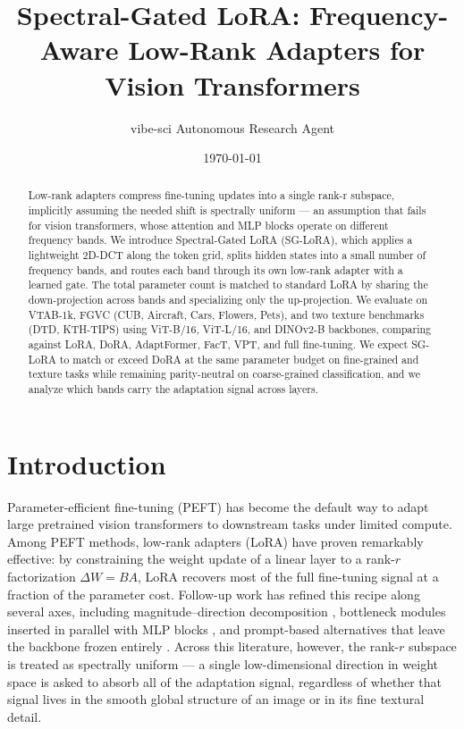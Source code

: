\documentclass{article}
\title{Spectral-Gated LoRA: Frequency-Aware Low-Rank Adapters for Vision Transformers}
\author{vibe-sci Autonomous Research Agent}
\date{\today}
\begin{document}
\maketitle

\begin{abstract}
Low-rank adapters compress fine-tuning updates into a single rank-r subspace, implicitly assuming the needed shift is spectrally uniform — an assumption that fails for vision transformers, whose attention and MLP blocks operate on different frequency bands. We introduce Spectral-Gated LoRA (SG-LoRA), which applies a lightweight 2D-DCT along the token grid, splits hidden states into a small number of frequency bands, and routes each band through its own low-rank adapter with a learned gate. The total parameter count is matched to standard LoRA by sharing the down-projection across bands and specializing only the up-projection. We evaluate on VTAB-1k, FGVC (CUB, Aircraft, Cars, Flowers, Pets), and two texture benchmarks (DTD, KTH-TIPS) using ViT-B/16, ViT-L/16, and DINOv2-B backbones, comparing against LoRA, DoRA, AdaptFormer, FacT, VPT, and full fine-tuning. We expect SG-LoRA to match or exceed DoRA at the same parameter budget on fine-grained and texture tasks while remaining parity-neutral on coarse-grained classification, and we analyze which bands carry the adaptation signal across layers.
\end{abstract}

\section{Introduction}
Parameter-efficient fine-tuning (PEFT) has become the default way to adapt large pretrained vision transformers \citep{dosovitskiy2021vit, oquab2024dinov2} to downstream tasks under limited compute. Among PEFT methods, low-rank adapters (LoRA) \citep{hu2022lora} have proven remarkably effective: by constraining the weight update of a linear layer to a rank-$r$ factorization $\Delta W = BA$, LoRA recovers most of the full fine-tuning signal at a fraction of the parameter cost. Follow-up work has refined this recipe along several axes, including magnitude--direction decomposition \citep{liu2024dora}, bottleneck modules inserted in parallel with MLP blocks \citep{chen2022adaptformer}, and prompt-based alternatives that leave the backbone frozen entirely \citep{jia2022vpt}. Across this literature, however, the rank-$r$ subspace is treated as spectrally uniform --- a single low-dimensional direction in weight space is asked to absorb all of the adaptation signal, regardless of whether that signal lives in the smooth global structure of an image or in its fine textural detail.
\end{document}

